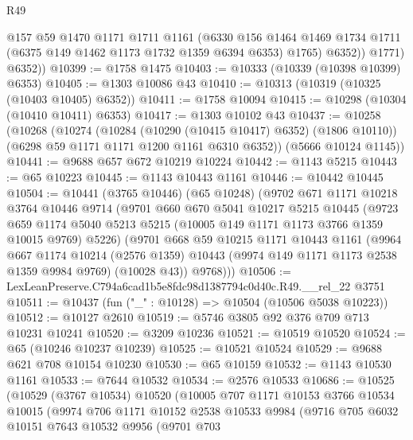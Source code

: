 \begin{lexlean}{R49}
\begin{coremodule}
              @157
              @59
              @1470
              @1171
              @1711
              @1161
              (@6330
                @156
                @1464
                @1469
                @1734
                @1711
                (@6375 @149 @1462 @1173 @1732 @1359 @6394 @6353)
                @1765)
              @6352))
          @1771)
        @6352))
@10399 := @1758 @1475
@10403 := @10333 (@10339 (@10398 @10399) @6353)
@10405 := @1303 @10086 @43
@10410 := @10313 (@10319 (@10325 (@10403 @10405) @6352))
@10411 := @1758 @10094
@10415 := @10298 (@10304 (@10410 @10411) @6353)
@10417 := @1303 @10102 @43
@10437 := @10258
    (@10268
      (@10274
        (@10284 (@10290 (@10415 @10417) @6352) (@1806 @10110))
        (@6298 @59 @1171 @1171 @1200 @1161 @6310 @6352))
      (@5666 @10124 @1145))
@10441 := @9688 @657 @672 @10219 @10224
@10442 := @1143 @5215
@10443 := @65 @10223
@10445 := @1143 @10443 @1161
@10446 := @10442 @10445
@10504 := @10441
    (@3765 @10446)
    (@65 @10248)
    (@9702
      @671
      @1171
      @10218
      @3764
      @10446
      @9714
      (@9701
        @660
        @670
        @5041
        @10217
        @5215
        @10445
        (@9723
          @659
          @1174
          @5040
          @5213
          @5215
          (@10005 @149 @1171 @1173 @3766 @1359 @10015 @9769)
          @5226)
        (@9701
          @668
          @59
          @10215
          @1171
          @10443
          @1161
          (@9964
            @667
            @1174
            @10214
            (@2576 @1359)
            @10443
            (@9974 @149 @1171 @1173 @2538 @1359 @9984 @9769)
            (@10028 @43))
          @9768)))
@10506 := LexLeanPreserve.C794a6cad1b5e8fdc98d1387794c0d40c.R49.__rel_22 @3751
@10511 := @10437 (fun ("_" : @10128) => @10504 (@10506 @5038 @10223))
@10512 := @10127 @2610
@10519 := @5746 @3805 @92 @376 @709 @713 @10231 @10241
@10520 := @3209 @10236
@10521 := @10519 @10520
@10524 := @65 (@10246 @10237 @10239)
@10525 := @10521 @10524
@10529 := @9688 @621 @708 @10154 @10230
@10530 := @65 @10159
@10532 := @1143 @10530 @1161
@10533 := @7644 @10532
@10534 := @2576 @10533
@10686 := @10525
    (@10529
      (@3767 @10534)
      @10520
      (@10005
        @707
        @1171
        @10153
        @3766
        @10534
        @10015
        (@9974
          @706
          @1171
          @10152
          @2538
          @10533
          @9984
          (@9716
            @705
            @6032
            @10151
            @7643
            @10532
            @9956
            (@9701
              @703

\end{coremodule}
\end{lexlean}
